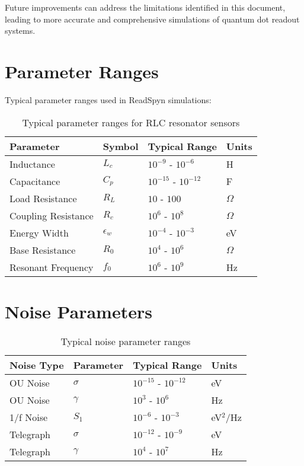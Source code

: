 \documentclass{article}
\begin{document}
Future improvements can address the limitations identified in this document, leading to more accurate and comprehensive simulations of quantum dot readout systems.

\appendix

\section{Parameter Ranges}

Typical parameter ranges used in ReadSpyn simulations:

\begin{table}[H]
\centering
\begin{tabular}{llll}
\toprule
Parameter & Symbol & Typical Range & Units \\
\midrule
Inductance & $L_c$ & $10^{-9}$ - $10^{-6}$ & H \\
Capacitance & $C_p$ & $10^{-15}$ - $10^{-12}$ & F \\
Load Resistance & $R_L$ & $10$ - $100$ & $\Omega$ \\
Coupling Resistance & $R_c$ & $10^6$ - $10^8$ & $\Omega$ \\
Energy Width & $\epsilon_w$ & $10^{-4}$ - $10^{-3}$ & eV \\
Base Resistance & $R_0$ & $10^4$ - $10^6$ & $\Omega$ \\
Resonant Frequency & $f_0$ & $10^6$ - $10^9$ & Hz \\
\bottomrule
\end{tabular}
\caption{Typical parameter ranges for RLC resonator sensors}
\end{table}

\section{Noise Parameters}

\begin{table}[H]
\centering
\begin{tabular}{llll}
\toprule
Noise Type & Parameter & Typical Range & Units \\
\midrule
OU Noise & $\sigma$ & $10^{-15}$ - $10^{-12}$ & eV \\
OU Noise & $\gamma$ & $10^3$ - $10^6$ & Hz \\
1/f Noise & $S_1$ & $10^{-6}$ - $10^{-3}$ & eV$^2$/Hz \\
Telegraph & $\sigma$ & $10^{-12}$ - $10^{-9}$ & eV \\
Telegraph & $\gamma$ & $10^4$ - $10^7$ & Hz \\
\bottomrule
\end{tabular}
\caption{Typical noise parameter ranges}
\end{table}
\end{document}
